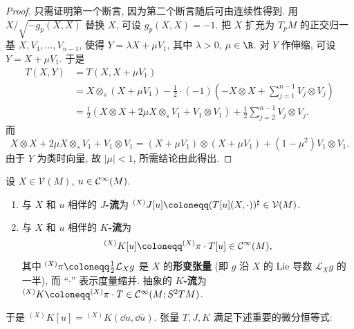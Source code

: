 \begin{proof}
只需证明第一个断言, 因为第二个断言随后可由连续性得到. 用 $X / \sqrt{-g_p(X, X)}$ 替换 $X$, 可设 $g_p(X, X) = -1$. 把 $X$ 扩充为 $T_p M$ 的正交归一基 $X, V_1, \ldots, V_{n-1}$, 使得 $Y = \lambda X + \mu V_1$, 其中 $\lambda > 0$, $\mu \in \R$. 对 $Y$ 作伸缩, 可设 $Y = X + \mu V_1$. 于是
\begin{equation}\label{eq:9.16}
    \begin{aligned}
        T(X, Y) &= T(X, X + \mu V_1) \\
        &= X \otimes_s (X + \mu V_1) - \frac12 \cdot (-1) \left( -X \otimes X + \sum_{j=1}^{n-1} V_j \otimes V_j \right) \\
        &= \frac12 \left( X \otimes X + 2\mu X \otimes_s V_1 + V_1 \otimes V_1 \right) + \frac12 \sum_{j=2}^{n-1} V_j \otimes V_j.
    \end{aligned}
\end{equation}
而
\begin{equation}\label{eq:9.17}
    X \otimes X + 2\mu X \otimes_s V_1 + V_1 \otimes V_1 = (X + \mu V_1) \otimes (X + \mu V_1) + (1 - \mu^2) V_1 \otimes V_1.
\end{equation}
由于 $Y$ 为类时向量, 故 $|\mu| < 1$, 所需结论由此得出.
\end{proof}

\begin{definition}[$J$-流与 $K$-流]\label{def:9.12}
设 $X \in \mathcal{V}(M)$, $u \in \mathcal{C}^\infty(M)$.
\begin{enumerate}
    \item 与 $X$ 和 $u$ 相伴的 \textbf{$J$-流}为 ${}^{(X)} J[u] \defeq (T[u](X, \cdot))^\sharp \in \mathcal{V}(M)$.
    \item 与 $X$ 和 $u$ 相伴的 \textbf{$K$-流}为
    \begin{equation}\label{eq:9.18}
        {}^{(X)} K[u] \defeq {}^{(X)} \pi \cdot T[u] \in \Smooth(M),
    \end{equation}
    其中 ${}^{(X)} \pi \defeq \frac12 \mathcal{L}_X g$ 是 $X$ 的\textbf{形变张量} (即 $g$ 沿 $X$ 的 Lie 导数 $\mathcal{L}_X g$ 的一半), 而 ``$\cdot$'' 表示度量缩并. 抽象的 \textbf{$K$-流}为 ${}^{(X)} K \defeq {}^{(X)} \pi \cdot T \in \Smooth(M; S^2 T M)$.
\end{enumerate}
\end{definition}

于是 ${}^{(X)} K[u] = {}^{(X)} K(\dd u, \dd \bar u)$. 张量 $T, J, K$ 满足下述重要的微分恒等式:

